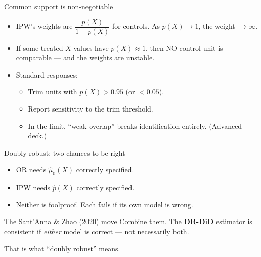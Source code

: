 \documentclass[aspectratio=169,11pt]{beamer}
\begin{document}
\begin{frame}{Common support is non-negotiable}
\vspace{0.4em}
\begin{itemize}\small
  \item IPW's weights are $\dfrac{p(X)}{1-p(X)}$ for controls. As $p(X) \to 1$, the weight $\to \infty$.
  \item If some treated $X$-values have $p(X) \approx 1$, then NO control unit is comparable --- and the weights are unstable.
  \item Standard responses:
  \begin{itemize}\small
    \item[--] Trim units with $p(X) > 0.95$ (or $< 0.05$).
    \item[--] Report sensitivity to the trim threshold.
    \item[--] In the limit, ``weak overlap'' breaks identification entirely. (Advanced deck.)
  \end{itemize}
\end{itemize}
\vspace{0.4em}
\end{frame}


\begin{frame}{Doubly robust: two chances to be right}
\vspace{0.4em}
\begin{itemize}
  \item OR needs $\widehat{\mu}_0(X)$ correctly specified.
  \item IPW needs $\widehat{p}(X)$ correctly specified.
  \item Neither is foolproof. Each fails if its own model is wrong.
\end{itemize}
\vspace{0.5em}
\begin{block}{The Sant'Anna \& Zhao (2020) move}
\small
Combine them. The \textbf{DR-DiD} estimator is consistent if \textit{either} model is correct --- not necessarily both.
\end{block}
\vspace{0.4em}
 \;\; That is what ``doubly robust'' means.
\end{frame}
\end{document}
